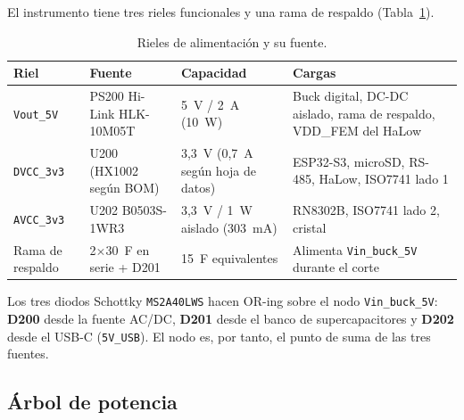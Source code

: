 \documentclass[11pt,a4paper]{article}
\begin{document}
El instrumento tiene tres rieles funcionales y una rama de respaldo
(Tabla~\ref{tab:rieles}).

\begin{table}[H]
\centering
\caption{Rieles de alimentación y su fuente.}
\label{tab:rieles}
\small
\begin{tabularx}{\textwidth}{@{}l l l X@{}}
\toprule
\textbf{Riel} & \textbf{Fuente} & \textbf{Capacidad} & \textbf{Cargas} \\
\midrule
\texttt{Vout\_5V} & PS200 Hi-Link HLK-10M05T & 5~V / 2~A (10~W) & Buck digital, DC-DC aislado, rama de respaldo, VDD\_FEM del HaLow \\
\texttt{DVCC\_3v3} & U200 (HX1002 según BOM) & 3,3~V (0,7~A según hoja de datos) & ESP32-S3, microSD, RS-485, HaLow, ISO7741 lado 1 \\
\texttt{AVCC\_3v3} & U202 B0503S-1WR3 & 3,3~V / 1~W aislado (303~mA) & RN8302B, ISO7741 lado 2, cristal \\
Rama de respaldo & 2$\times$30~F en serie + D201 & 15~F equivalentes & Alimenta \texttt{Vin\_buck\_5V} durante el corte \\
\bottomrule
\end{tabularx}
\end{table}

\noindent Los tres diodos Schottky \texttt{MS2A40LWS} hacen OR-ing sobre el nodo
\texttt{Vin\_buck\_5V}: \textbf{D200} desde la fuente AC/DC, \textbf{D201} desde
el banco de supercapacitores y \textbf{D202} desde el USB-C
(\texttt{5V\_USB}). El nodo es, por tanto, el punto de suma de las tres
fuentes.

\subsection{Árbol de potencia}
\end{document}
